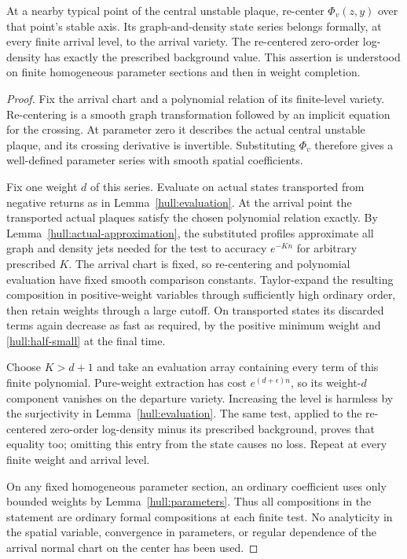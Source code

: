 \begin{lemma}\label{hull:transport}
At a nearby typical point of the central unstable plaque, re-center
$\Phi_v(z,y)$ over that point's stable axis. Its graph-and-density
state series belongs formally, at every finite arrival level, to the
arrival variety. The re-centered zero-order log-density has exactly
the prescribed background value. This assertion is understood on
finite homogeneous parameter sections and then in weight completion.
\end{lemma}

\begin{proof}
Fix the arrival chart and a polynomial relation of its finite-level
variety. Re-centering is a smooth graph transformation followed by
an implicit equation for the crossing. At parameter zero it describes
the actual central unstable plaque, and its crossing derivative is
invertible. Substituting $\Phi_v$ therefore gives a well-defined
parameter series with smooth spatial coefficients.

Fix one weight $d$ of this series. Evaluate on actual states transported
from negative returns as in Lemma~\ref{hull:evaluation}. At the arrival
point the transported actual plaques satisfy the chosen polynomial
relation exactly. By Lemma~\ref{hull:actual-approximation}, the
substituted profiles approximate all graph and density jets needed
for the test to accuracy $e^{-Kn}$ for arbitrary prescribed $K$.
The arrival chart is fixed, so re-centering and polynomial evaluation
have fixed smooth comparison constants. Taylor-expand the resulting
composition in positive-weight variables through sufficiently high
ordinary order, then retain weights through a large cutoff. On
transported states its discarded terms again decrease as fast as
required, by the positive minimum weight and
\eqref{hull:half-small} at the final time.

Choose $K>d+1$ and take an evaluation array containing every term of
this finite polynomial. Pure-weight extraction has cost
$e^{(d+\epsilon)n}$, so its weight-$d$ component vanishes on the
departure variety. Increasing the level is harmless by the
surjectivity in Lemma~\ref{hull:evaluation}. The same test, applied to
the re-centered zero-order log-density minus its prescribed background,
proves that equality too; omitting this entry from the state causes no
loss. Repeat at every finite weight and arrival level.

On any fixed homogeneous parameter section, an ordinary coefficient
uses only bounded weights by Lemma~\ref{hull:parameters}. Thus all
compositions in the statement are ordinary formal compositions at
each finite test. No analyticity in the spatial variable, convergence
in parameters, or regular dependence of the arrival normal chart on
the center has been used.
\end{proof}

